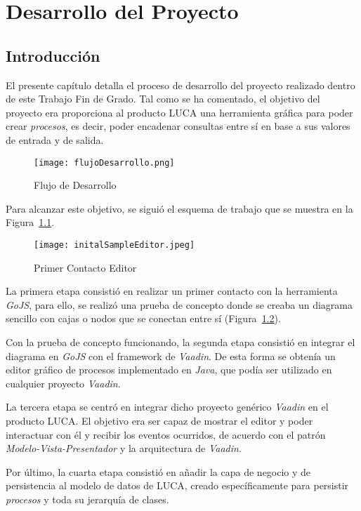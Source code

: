 \chapter{Desarrollo del Proyecto}

\minitoc

\section{Introducción}

El presente capítulo detalla el proceso de desarrollo del proyecto realizado dentro de este Trabajo Fin de Grado. Tal como se ha comentado, el objetivo del proyecto era
proporciona al producto LUCA una herramienta gráfica para poder crear \emph{procesos}, es decir, poder encadenar consultas entre sí en base a sus valores de entrada y de salida.

\begin{figure}[H]
	\centering
	\texttt{[image: flujoDesarrollo.png]}
	\caption{Flujo de Desarrollo}
	\label{fig:flujoDesarrollo}
\end{figure}

Para alcanzar este objetivo, se siguió el esquema de trabajo que se muestra en la Figura~\ref{fig:flujoDesarrollo}.

\begin{figure}[H]
	\centering
	\texttt{[image: initalSampleEditor.jpeg]}
	\caption{Primer Contacto Editor}
	\label{fig:initialSampleEditor}
\end{figure}

La primera etapa consistió en realizar un primer contacto con la herramienta \emph{GoJS}, para ello, se realizó una prueba de concepto donde se creaba un diagrama sencillo con cajas o nodos que se conectan entre sí (Figura~\ref{fig:initialSampleEditor}).

Con la prueba de concepto funcionando, la segunda etapa consistió en integrar el diagrama en \emph{GoJS} con el framework de \emph{Vaadin}. De esta forma se obtenía un editor gráfico de procesos implementado en \emph{Java}, que podía ser utilizado en cualquier proyecto \emph{Vaadin}.

La tercera etapa se centró en integrar dicho proyecto genérico \emph{Vaadin} en el producto LUCA.  El objetivo era ser capaz de mostrar el editor y poder interactuar con él y recibir los eventos ocurridos, de acuerdo con el patrón \emph{Modelo-Vista-Presentador} y la arquitectura de \emph{Vaadin}.

Por último, la cuarta etapa consistió en añadir la capa de negocio y de persistencia al modelo de datos de LUCA, creado específicamente para persistir \emph{procesos} y toda su jerarquía de clases.

